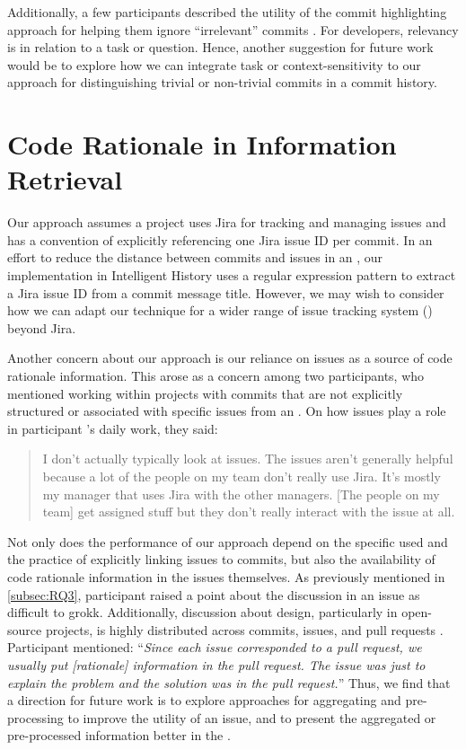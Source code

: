 Additionally, a few participants described the utility of the commit highlighting
approach for helping them ignore ``irrelevant'' commits .
For developers, relevancy is in relation to a task or question.
Hence, another suggestion for future work would be to explore how
we can integrate task or context-sensitivity to our approach for distinguishing trivial or non-trivial
commits in a commit history.


\section{Code Rationale in Information Retrieval}

Our approach assumes a project uses Jira for tracking and managing issues and has
a convention of explicitly referencing one Jira issue ID per commit.
In an effort to reduce the distance between commits and issues in an ,
our implementation in Intelligent History uses a regular expression pattern 
to extract a Jira issue ID from a commit message title.
However, we may wish to consider how we can adapt our technique for a wider range of
issue tracking system () beyond Jira.

Another concern about our approach is our reliance on issues
as a source of code rationale information.
This arose as a concern among two participants, who mentioned working within projects
with commits that are not explicitly structured or associated with specific issues
from an  .
On how issues play a role in participant 's daily work, they said:

\begin{quote}
    I don’t actually typically look at issues. 
    The issues aren’t generally helpful because a lot of the people on my team don’t really use Jira. 
    It’s mostly my manager that uses Jira with the other managers. 
    [The people on my team] get assigned stuff but they don’t really interact with the issue at all.
\end{quote}

Not only does the performance of our approach depend on the specific
 used and the practice of explicitly linking issues to commits,
but also the availability of code rationale information in the issues themselves.
As previously mentioned in \autoref{subsec:RQ3},
participant  raised a point about the discussion in an issue as difficult to grokk.
Additionally, discussion about design, particularly in open-source projects,
is highly distributed across commits, issues, and pull requests \cite{brunet_design_2014}.
Participant  mentioned:
``\textit{Since each issue corresponded to a pull request, we usually put [rationale] information in the pull request. 
The issue was just to explain the problem and the solution was in the pull request.}''
Thus, we find that a direction for future work is to explore approaches for aggregating and pre-processing
to improve the utility of an issue, and to present the aggregated or pre-processed information better in the .


